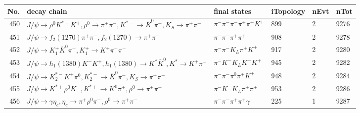 \begin{table}[htbp] 
\begin{center}
\begin{small}
\begin{tabular}{rlllll}\hline\hline
 No. & decay chain & final states &  iTopology & nEvt & nTot \\\hline
450&$J/\psi       \rightarrow \rho^{0}      K^{*-}         K^{+}          , \rho^{0}       \rightarrow \pi^{+}        \pi^{-}        , K^{*-}          \rightarrow \bar{K}^{0}   \pi^{-}        , K_{S}           \rightarrow \pi^{+}        \pi^{-}        $&$\pi^{-}        \pi^{-}        \pi^{-}        \pi^{+}        \pi^{+}        K^{+}          $&  899&    2& 9276\\
451&$J/\psi       \rightarrow f_{2}(1270)    \pi^{+}        \pi^{-}        , f_{2}(1270)     \rightarrow \pi^{+}        \pi^{-}        $&$\pi^{-}        \pi^{-}        \pi^{+}        \pi^{+}        $&  908&    2& 9278\\
452&$J/\psi       \rightarrow K_1^{+}        \bar{K}^{0}   \pi^{-}        , K_1^{+}         \rightarrow K^{+}          \pi^{+}        \pi^{-}        $&$\pi^{-}        \pi^{-}        K_{L}          \pi^{+}        K^{+}          $&  917&    2& 9280\\
453&$J/\psi       \rightarrow h_{1}(1380)    K^{-}          K^{+}          , h_{1}(1380)     \rightarrow K^{*}          \bar{K}^{0}   , K^{*}           \rightarrow K^{+}          \pi^{-}        $&$\pi^{-}        K^{-}          K_{L}          K^{+}          K^{+}          $&  945&    2& 9282\\
454&$J/\psi       \rightarrow K_2^{*-}       K^{+}          \pi^{0}        , K_2^{*-}        \rightarrow \bar{K}^{0}   \pi^{-}        , K_{S}           \rightarrow \pi^{+}        \pi^{-}        $&$\pi^{-}        \pi^{-}        \pi^{0}        \pi^{+}        K^{+}          $&  948&    2& 9284\\
455&$J/\psi       \rightarrow K^{*+}         \rho^{0}      K^{-}          , K^{*+}          \rightarrow K^{0}          \pi^{+}        , \rho^{0}       \rightarrow \pi^{+}        \pi^{-}        $&$\pi^{-}        K^{-}          K_{L}          \pi^{+}        \pi^{+}        $&  953&    2& 9286\\
456&$J/\psi       \rightarrow \gamma       \eta_{c}    , \eta_{c}     \rightarrow \pi^{+}        \rho^{0}      \pi^{-}        , \rho^{0}       \rightarrow \pi^{+}        \pi^{-}        $&$\pi^{-}        \pi^{-}        \pi^{+}        \pi^{+}        \gamma       $&  225&    1& 9287\\

\end{tabular}
\end{small}
\end{center}
\end{table}
